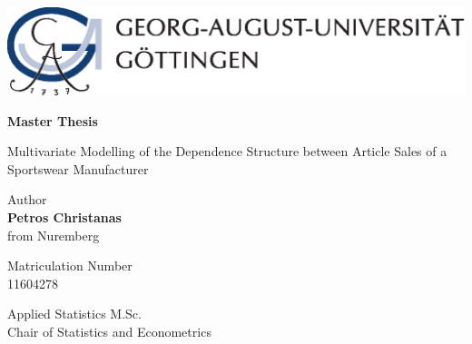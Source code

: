 
\thispagestyle{empty}
\begin{center}


\begin{minipage}{0.75\linewidth}
    \centering
    \includegraphics[scale = 0.7]{figures/uni_goettingen_logo.eps}\\
    
    \vspace{1cm}
    
{{\Huge \textbf{Master Thesis} \par}}
    
\vspace{0.5cm}
    
    {{\LARGE Multivariate Modelling of the Dependence Structure between Article Sales of a Sportswear Manufacturer\par}}
    \vspace{1cm}
    
    
\begin{center}
Author\\
{\LARGE \textbf{Petros Christanas}} \\
{\large from Nuremberg} 


\vspace{0.5cm}

Matriculation Number \\
{\large 11604278}

\vspace{1cm}

{\Large Applied Statistics M.Sc.}\\
{\large Chair of Statistics and Econometrics}

\end{center}
    
    \end{minipage}
\end{center}


\vspace{1.5cm}

